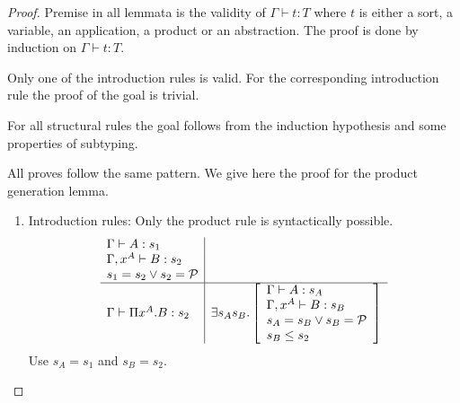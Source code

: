 \begin{theorem}
    \begin{proof}
        Premise in all lemmata is the validity of $\Gamma \vdash t: T$ where $t$
        is either a sort, a variable, an application, a product or an
        abstraction. The proof is done by induction on $\Gamma \vdash t: T$.

        Only one of the introduction rules is valid. For the corresponding
        introduction rule the proof of the goal is trivial.

        For all structural rules the goal follows from the induction hypothesis
        and some properties of subtyping.

        All proves follow the same pattern. We give here the proof for the
        product generation lemma.

        {\def\goal#1#2#3#4#5#6{
            \exists #1 #2.
            \left[
            \begin{array}{l}
                \derives {#3} #4 #1
                \\
                \derives {#3,x^#4} #5 #2
                \\
                #1 = #2 \lor #2 = \Prop
                \\
                #2 \le #6
            \end{array}
            \right]
         }
        \begin{enumerate}
            \item Introduction rules: Only the product rule is syntactically
                possible.
                $$
                \begin{array}{l|l}
                    \derives \Gamma A {s_1}
                    \\
                    \derives {\Gamma,x^A} B {s_2}
                    \\
                    s_1 = s_2 \lor s_2 = \Prop
                    \\
                    \hline
                    \derives \Gamma {\Pi x^A. B} {s_2}
                    &
                    \goal {s_A} {s_B} \Gamma A B {s_2}
                \end{array}
                $$
                Use $s_A = s_1$ and $s_B = s_2$.


\end{enumerate}}
\end{proof}
\end{theorem}
